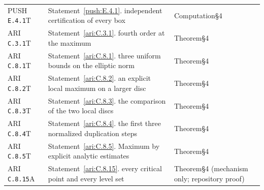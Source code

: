 \documentclass[11pt,a4paper]{article}
\theoremstyle{plain}
\theoremstyle{definition}
\begin{document}
\begin{longtable}{@{}L{.18\linewidth}L{.48\linewidth}L{.29\linewidth}@{}}
PUSH \nolinkurl{E.4.1}\newline T & Statement~\ref{push:E.4.1}. independent certification of every box\newline {} & Computation\newline §4\\
ARI \nolinkurl{C.3.1}\newline T & Statement~\ref{ari:C.3.1}. fourth order at the maximum\newline {} & Theorem\newline §4\\
ARI \nolinkurl{C.8.1}\newline T & Statement~\ref{ari:C.8.1}. three uniform bounds on the elliptic norm\newline {} & Theorem\newline §4\\
ARI \nolinkurl{C.8.2}\newline T & Statement~\ref{ari:C.8.2}. an explicit local maximum on a larger disc\newline {} & Theorem\newline §4\\
ARI \nolinkurl{C.8.3}\newline T & Statement~\ref{ari:C.8.3}. the comparison of the two local discs\newline {} & Theorem\newline §4\\
ARI \nolinkurl{C.8.4}\newline T & Statement~\ref{ari:C.8.4}. the first three normalized duplication steps\newline {} & Theorem\newline §4\\
ARI \nolinkurl{C.8.5}\newline T & Statement~\ref{ari:C.8.5}. Maximum by explicit analytic estimates\newline {} & Theorem\newline §4\\
ARI \nolinkurl{C.8.15}\newline A & Statement~\ref{ari:C.8.15}. every critical point and every level set\newline {} & Theorem\newline §4 (mechanism only; repository proof)\\

\end{longtable}
\end{document}
